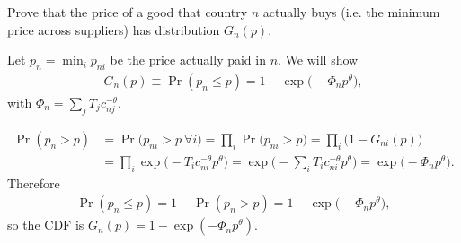 Prove that the price of a good that country $n$ actually buys (i.e. the minimum price across suppliers) has distribution $G_n(p)$.

\begin{solution}
Let $p_n=\min_i p_{ni}$ be the price actually paid in $n$. We will show
\begin{align*}
G_n(p)\equiv \Pr(p_n \le p) = 1 - \exp\!\big(-\Phi_n p^{\theta}\big),
\end{align*}
with $\Phi_n=\sum_j T_j c_{nj}^{-\theta}$.

\begin{align*}
\Pr(p_n > p)
&= \Pr\big(p_{ni} > p\ \forall i\big)
= \prod_i \Pr\big(p_{ni} > p\big)
= \prod_i \big(1 - G_{ni}(p)\big) \\
&= \prod_i \exp\!\big(-T_i c_{ni}^{-\theta} p^{\theta}\big)
= \exp\!\Big(-\sum_i T_i c_{ni}^{-\theta} p^{\theta}\Big)
= \exp\!\big(-\Phi_n p^{\theta}\big).
\end{align*}
Therefore
\begin{align*}
\Pr(p_n \le p) = 1 - \Pr(p_n>p) = 1 - \exp\!\big(-\Phi_n p^{\theta}\big),
\end{align*}
so the CDF is $G_n(p)=1-\exp(-\Phi_n p^\theta)$.
\end{solution}